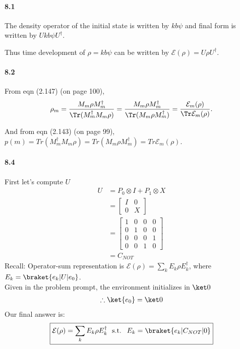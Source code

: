 
\paragraph{8.1}
The density operator of the initial state is written by $kb \psi$ and final form is written by $U kb \psi U^\dagger$.

Thus time development of $\rho = kb \psi$ can be written by 
$\mathcal{E}(\rho) = U\rho U^\dagger$.

\paragraph{8.2}
From eqn (2.147) (on page 100),
\begin{align*}
	\rho_m = \frac{M_m \rho M_m^\dagger}{\Tr (M_m^\dagger  M_m\rho ) }
					= \frac{M_m \rho M_m^\dagger}{\Tr ( M_m \rho M_m^\dagger ) }
					= \frac{\mathcal{E}_m (\rho)}{\Tr \mathcal{E}_m (\rho)}.
\end{align*}

And from eqn (2.143) (on page 99), $p(m) = Tr (M_m^\dagger M_m \rho) = Tr (M_m \rho M_m^\dagger) = Tr \mathcal {E}_m (\rho)$.

\paragraph{8.4}
First let's compute $U$
\begin{align*}
    U & = P_0 \otimes I + P_1 \otimes X\\
    & = \begin{bmatrix} I & 0 \\ 0 & X \end{bmatrix}\\
    & = \begin{bmatrix} 1 &0 & 0 & 0\\
    0 & 1 & 0 & 0\\
    0 & 0 & 0 & 1\\
    0 & 0 & 1 & 0
    \end{bmatrix}\\
    & = C_{NOT}
\end{align*}
Recall: Operator-sum representation is $\mathcal E(\rho) = \sum_k E_k \rho E_k^\dagger$, where $E_k = \braket{e_k | U | e_0}$.\\
Given in the problem prompt, the environment initializes in $\ket 0$
\begin{align*}
    \therefore \ket{e_0} = \ket 0
\end{align*}
Our final answer is:
\begin{align*}
    \boxed{\mathcal E(\rho) = \sum_k E_k \rho E_k^\dagger \  \text{ s.t. } \ E_k = \braket{e_k | C_{NOT} | 0}}
\end{align*}
